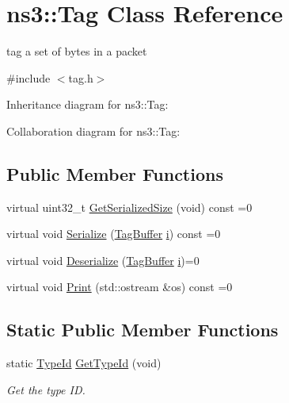 \hypertarget{classns3_1_1Tag}{}\section{ns3\+:\+:Tag Class Reference}
\label{classns3_1_1Tag}


tag a set of bytes in a packet  




{\ttfamily \#include $<$tag.\+h$>$}



Inheritance diagram for ns3\+:\+:Tag\+:


Collaboration diagram for ns3\+:\+:Tag\+:
\subsection*{Public Member Functions}
\begin{DoxyCompactItemize}
\item 
virtual uint32\+\_\+t \hyperlink{classns3_1_1Tag_a01c8efdea943fd8cce2ef5d4d67eefa6}{Get\+Serialized\+Size} (void) const =0
\item 
virtual void \hyperlink{classns3_1_1Tag_ac9aa7c4f923da5d2c82de94690101dc3}{Serialize} (\hyperlink{classns3_1_1TagBuffer}{Tag\+Buffer} \hyperlink{lte__uplink__power__control_8m_a6f6ccfcf58b31cb6412107d9d5281426}{i}) const =0
\item 
virtual void \hyperlink{classns3_1_1Tag_ae166b7f816bcbdef44dbeb636c9fa712}{Deserialize} (\hyperlink{classns3_1_1TagBuffer}{Tag\+Buffer} \hyperlink{lte__uplink__power__control_8m_a6f6ccfcf58b31cb6412107d9d5281426}{i})=0
\item 
virtual void \hyperlink{classns3_1_1Tag_acede040468ac809d0843e66e846ed8c4}{Print} (std\+::ostream \&os) const =0
\end{DoxyCompactItemize}
\subsection*{Static Public Member Functions}
\begin{DoxyCompactItemize}
\item 
static \hyperlink{classns3_1_1TypeId}{Type\+Id} \hyperlink{classns3_1_1Tag_a08ae5a07dea59d4d495405dc551966e8}{Get\+Type\+Id} (void)
\begin{DoxyCompactList}\small\item\em Get the type ID. \end{DoxyCompactList}\end{DoxyCompactItemize}
